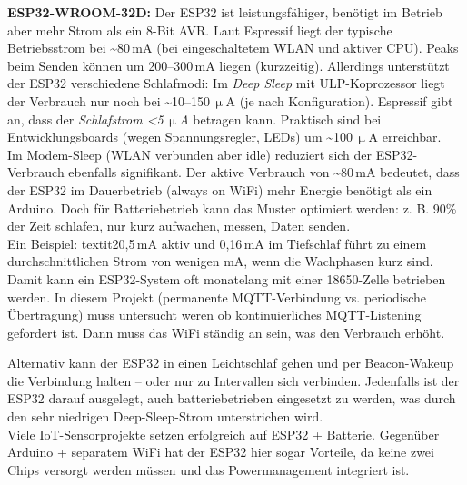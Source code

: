 \noindent\textbf{ESP32-WROOM-32D:} Der ESP32 ist leistungsfähiger, benötigt im Betrieb aber mehr Strom als ein 8-Bit AVR. Laut Espressif liegt der typische Betriebsstrom bei \textasciitilde80\,mA (bei eingeschaltetem WLAN und aktiver CPU). \autocite{esp_datasheet} Peaks beim Senden können um 200–300\,mA liegen (kurzzeitig). Allerdings unterstützt der ESP32 verschiedene Schlafmodi: Im \textit{Deep Sleep} mit ULP-Koprozessor liegt der Verbrauch nur noch bei \textasciitilde10–150\,$\upmu$A (je nach Konfiguration). \autocite{esp32_sleep} \autocite{esp32_comparison} Espressif gibt an, dass der \textit{Schlafstrom <5\,$\upmu$A} betragen kann. \autocite{esp_datasheet} Praktisch sind bei Entwicklungsboards (wegen Spannungsregler, LEDs) um \textasciitilde100\,$\upmu$A erreichbar. 
\\
Im Modem-Sleep (WLAN verbunden aber idle) reduziert sich der ESP32-Verbrauch ebenfalls signifikant. Der aktive Verbrauch von \textasciitilde80\,mA bedeutet, dass der ESP32 im Dauerbetrieb (always on WiFi) mehr Energie benötigt als ein Arduino. Doch für Batteriebetrieb kann das Muster optimiert werden: z. B. 90\% der Zeit schlafen, nur kurz aufwachen, messen, Daten senden. 
\\
Ein Beispiel: textit{20{,}5\,mA aktiv und 0{,}16\,mA im Tiefschlaf} führt zu einem durchschnittlichen Strom von wenigen mA, wenn die Wachphasen kurz sind. \autocite{esp32_comparison} Damit kann ein ESP32-System oft monatelang mit einer 18650-Zelle betrieben werden. In diesem Projekt (permanente MQTT-Verbindung vs. periodische Übertragung) muss untersucht weren ob kontinuierliches MQTT-Listening gefordert ist. Dann muss das WiFi ständig an sein, was den Verbrauch erhöht. 

Alternativ kann der ESP32 in einen Leichtschlaf gehen und per Beacon-Wakeup die Verbindung halten – oder nur zu Intervallen sich verbinden. Jedenfalls ist der ESP32 darauf ausgelegt, auch batteriebetrieben eingesetzt zu werden, was durch den sehr niedrigen Deep-Sleep-Strom unterstrichen wird. \autocite{esp_datasheet} 
\\
Viele IoT-Sensorprojekte setzen erfolgreich auf ESP32 + Batterie. Gegenüber Arduino + separatem WiFi hat der ESP32 hier sogar Vorteile, da keine zwei Chips versorgt werden müssen und das Powermanagement integriert ist.


\vspace{5mm}

